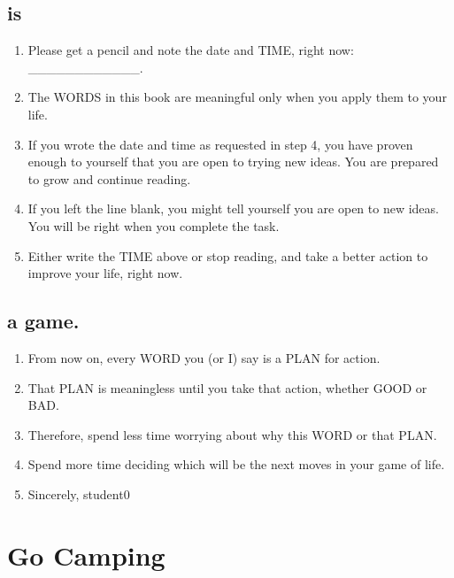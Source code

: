 \documentclass[
]{book}
\providecommand{\tightlist}{%
  \setlength{\itemsep}{0pt}\setlength{\parskip}{0pt}}
\begin{document}
\hypertarget{is}{%
\subsection{is}\label{is}}

\begin{enumerate}
\def\labelenumi{\arabic{enumi}.}
\setcounter{enumi}{3}
\tightlist
\item
  Please get a pencil and note the date and TIME, right now: \_\_\_\_\_\_\_\_\_\_\_\_.
\item
  The WORDS in this book are meaningful only when you apply them to your life.
\item
  If you wrote the date and time as requested in step 4, you have proven enough to yourself that you are open to trying
  new ideas. You are prepared to grow and continue reading.
\item
  If you left the line blank, you might tell yourself you are open to new ideas. You
  will be right when you complete the task.
\item
  Either write the TIME above or stop reading, and take a better action to improve
  your life, right now.
\end{enumerate}

\hypertarget{a-game.}{%
\subsection{a game.}\label{a-game.}}

\begin{enumerate}
\def\labelenumi{\arabic{enumi}.}
\setcounter{enumi}{8}
\item
  From now on, every WORD you (or I) say is a PLAN for action.
\item
  That PLAN is meaningless until you take that action, whether GOOD or BAD.
\item
  Therefore, spend less time worrying about why this WORD or that PLAN.
\item
  Spend more time deciding which will be the next moves in your game of life.
\item
  Sincerely, student0
\end{enumerate}

\hypertarget{go-camping}{%
\section{Go Camping}\label{go-camping}}
\end{document}
